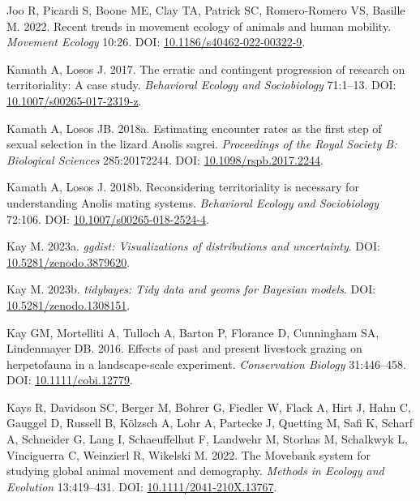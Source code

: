 \documentclass[10pt,a4paper]{article}
\newlength{\cslhangindent}
\newenvironment{CSLReferences}[2] %
 {\begin{list}{}{%
  \setlength{\itemindent}{0pt}
  \setlength{\leftmargin}{0pt}
  \setlength{\parsep}{0pt}
  \ifodd #1
   \setlength{\leftmargin}{\cslhangindent}
   \setlength{\itemindent}{-1\cslhangindent}
  \fi
  \setlength{\itemsep}{#2\baselineskip}}}
 {\end{list}}
\begin{document}
\begin{CSLReferences}{1}{0}
Joo R, Picardi S, Boone ME, Clay TA, Patrick SC, Romero-Romero VS, Basille M. 2022. Recent trends in movement ecology of animals and human mobility. \emph{Movement Ecology} 10:26. DOI: \href{https://doi.org/10.1186/s40462-022-00322-9}{10.1186/s40462-022-00322-9}.

Kamath A, Losos J. 2017. The erratic and contingent progression of research on territoriality: A case study. \emph{Behavioral Ecology and Sociobiology} 71:1--13. DOI: \href{https://doi.org/10.1007/s00265-017-2319-z}{10.1007/s00265-017-2319-z}.

Kamath A, Losos JB. 2018a. Estimating encounter rates as the first step of sexual selection in the lizard {Anolis} sagrei. \emph{Proceedings of the Royal Society B: Biological Sciences} 285:20172244. DOI: \href{https://doi.org/10.1098/rspb.2017.2244}{10.1098/rspb.2017.2244}.

Kamath A, Losos J. 2018b. Reconsidering territoriality is necessary for understanding {Anolis} mating systems. \emph{Behavioral Ecology and Sociobiology} 72:106. DOI: \href{https://doi.org/10.1007/s00265-018-2524-4}{10.1007/s00265-018-2524-4}.

Kay M. 2023a. \emph{{ggdist}: Visualizations of distributions and uncertainty}. DOI: \href{https://doi.org/10.5281/zenodo.3879620}{10.5281/zenodo.3879620}.

Kay M. 2023b. \emph{{tidybayes}: Tidy data and geoms for {Bayesian} models}. DOI: \href{https://doi.org/10.5281/zenodo.1308151}{10.5281/zenodo.1308151}.

Kay GM, Mortelliti A, Tulloch A, Barton P, Florance D, Cunningham SA, Lindenmayer DB. 2016. Effects of past and present livestock grazing on herpetofauna in a landscape-scale experiment. \emph{Conservation Biology} 31:446--458. DOI: \href{https://doi.org/10.1111/cobi.12779}{10.1111/cobi.12779}.

Kays R, Davidson SC, Berger M, Bohrer G, Fiedler W, Flack A, Hirt J, Hahn C, Gauggel D, Russell B, Kölzsch A, Lohr A, Partecke J, Quetting M, Safi K, Scharf A, Schneider G, Lang I, Schaeuffelhut F, Landwehr M, Storhas M, Schalkwyk L, Vinciguerra C, Weinzierl R, Wikelski M. 2022. The {Movebank} system for studying global animal movement and demography. \emph{Methods in Ecology and Evolution} 13:419--431. DOI: \href{https://doi.org/10.1111/2041-210X.13767}{10.1111/2041-210X.13767}.


\end{CSLReferences}
\end{document}
